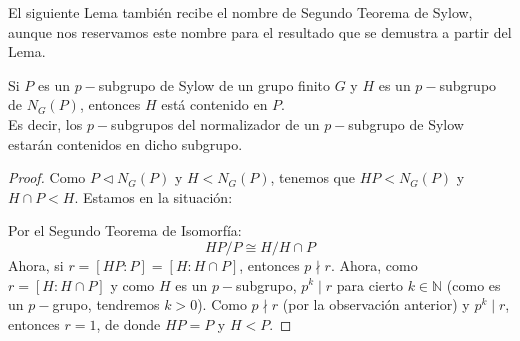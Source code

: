 \noindent
El siguiente Lema también recibe el nombre de Segundo Teorema de Sylow, aunque nos reservamos este nombre para el resultado que se demustra a partir del Lema.
\begin{lema}
    Si $P$ es un $p-$subgrupo de Sylow de un grupo finito $G$ y $H$ es un $p-$subgrupo de $N_G(P)$, entonces $H$ está contenido en $P$.\\

    \noindent
    Es decir, los $p-$subgrupos del normalizador de un $p-$subgrupo de Sylow estarán contenidos en dicho subgrupo. 
    \begin{proof}
        Como $P\lhd N_G(P)$ y $H<N_G(P)$, tenemos que $HP < N_G(P)$ y $H\cap P < H$. Estamos en la situación:
        \begin{figure}[H]
            \centering
        \end{figure}
        \noindent
        Por el Segundo Teorema de Isomorfía:
        \begin{equation*}
            HP/P \cong H/H\cap P
        \end{equation*}
        Ahora, si $r = [HP:P] = [H:H\cap P]$, entonces $p\nmid r$. Ahora, como $r = [H:H\cap P]$ y como $H$ es un $p-$subgrupo, $p^k \mid r$ para cierto $k\in \mathbb{N}$ (como es un $p-$grupo, tendremos $k>0$). Como $p\nmid r$ (por la observación anterior) y $p^k \mid r$, entonces $r = 1$, de donde $HP = P$ y $H<P$.
    \end{proof}
\end{lema}

